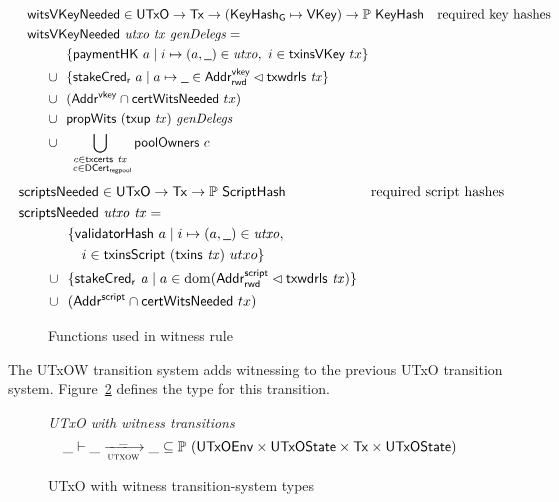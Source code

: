 \begin{figure}[htb]
  \begin{align*}
    & \hspace{-0.8cm}\fun{witsVKeyNeeded} \in \UTxO \to \Tx \to (\KeyHashGen\mapsto\VKey) \to
      \powerset{\KeyHash}
    & \text{required key hashes} \\
    &  \hspace{-0.8cm}\fun{witsVKeyNeeded}~\var{utxo}~\var{tx}~\var{genDelegs} = \\
    & ~~\{ \fun{paymentHK}~a \mid i \mapsto (a, \wcard) \in \var{utxo},~i\in\fun{txinsVKey}~{tx} \} \\
    \cup & ~~
           \{\fun{stakeCred_r}~a\mid a\mapsto \wcard \in \AddrRWDVKey
      \restrictdom \txwdrls{tx}\}\\
    \cup & ~~(\AddrVKey \cap \fun{certWitsNeeded}~{tx}) \\
    \cup & ~~\fun{propWits}~(\fun{txup}~\var{tx})~\var{genDelegs} \\
    \cup & ~~\bigcup_{\substack{c \in \txcerts{tx} \\ ~c \in\DCertRegPool}} \fun{poolOwners}~{c}
  \end{align*}
  \begin{align*}
    & \hspace{-1cm}\fun{scriptsNeeded} \in \UTxO \to \Tx \to
      \powerset{\HashScr}
    & \text{required script hashes} \\
    &  \hspace{-1cm}\fun{scriptsNeeded}~\var{utxo}~\var{tx} = \\
    & ~~\{ \fun{validatorHash}~a \mid i \mapsto (a, \wcard) \in \var{utxo},\\
    & ~~~~~i\in\fun{txinsScript}~{(\fun{txins~\var{tx}})}~{utxo}\} \\
    \cup & ~~\{ \fun{stakeCred_{r}}~\var{a} \mid a \in \dom (\AddrRWDScr
           \restrictdom \fun{txwdrls}~\var{tx}) \} \\
      \cup & ~~(\AddrScr \cap \fun{certWitsNeeded}~{tx})
  \end{align*}
  \caption{Functions used in witness rule}
  \label{fig:functions-witnesses}
\end{figure}

The UTxOW transition system adds witnessing to the previous UTxO transition system.
Figure~\ref{fig:ts-types:utxow-shelley} defines the type for this transition.

\begin{figure}
  \emph{UTxO with witness transitions}
  \begin{equation*}
    \var{\_} \vdash
    \var{\_} \trans{utxow}{\_} \var{\_}
    \subseteq \powerset (\UTxOEnv \times \UTxOState \times \Tx \times \UTxOState)
  \end{equation*}
  \caption{UTxO with witness transition-system types}
  \label{fig:ts-types:utxow-shelley}
\end{figure}

